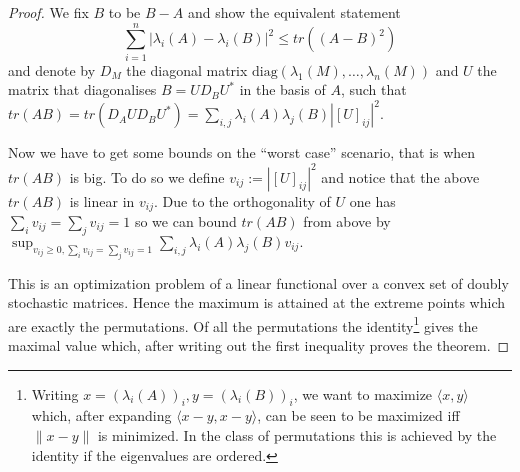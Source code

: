 \begin{proof}
	We fix $B$ to be $B-A$ and show the equivalent statement $$\sum_{i=1}^n |\lambda_i(A)-\lambda_i(B)|^2\leq tr\left((A-B)^2\right)$$
	and denote by $D_M$ the diagonal matrix $\text{diag}(\lambda_1(M),\dots,\lambda_n(M))$ and $U$ the matrix that diagonalises $B=UD_BU^*$ in the basis of $A$, such that $tr(AB)=tr(D_A U D_B U^*)=\sum_{i,j}\lambda_i(A)\lambda_j(B)|[U]_{ij}|^2.$
	
	Now we have to get some bounds on the ``worst case'' scenario, that is when $tr(AB)$ is big. To do so we define $v_{ij}:=|[U]_{ij}|^2$ and notice that the above $tr(AB)$ is linear in $v_{ij}$. Due to the orthogonality of $U$ one has $\sum_i v_{ij}=\sum_j v_{ij}=1$ so we can bound $tr(AB)$ from above by $\sup_{v_{ij}\geq 0,\sum_i v_{ij}=\sum_j v_{ij}=1}\sum_{i,j}\lambda_i(A)\lambda_j(B)v_{ij}.$
	
	This is an optimization problem of a linear functional over a convex set of doubly stochastic matrices. Hence the maximum is attained at the extreme points which are exactly the permutations. Of all the permutations the identity\footnote{Writing $x=(\lambda_i(A))_i, y=(\lambda_i(B))_i$, we want to maximize $\langle x,y\rangle$ which, after expanding $\langle x-y,x-y\rangle$, can be seen to be maximized iff $\|x-y\|$ is minimized. In the class of permutations this is achieved by the identity if the eigenvalues are ordered.} gives the maximal value which, after writing out the first inequality proves the theorem.
\end{proof}

